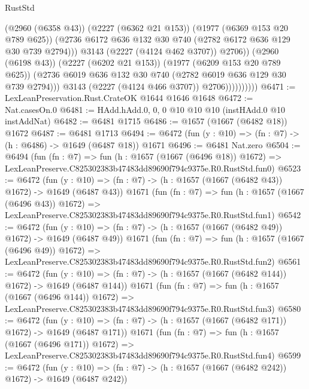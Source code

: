 \begin{lexlean}{RustStd}
\begin{coremodule}
                                (@2960 (@6358 @43))
                                (@2227 (@6362 @21 @153))
                                (@1977 (@6369 @153 @20 @789 @625))
                                (@2736
                                  @6172
                                  @636
                                  @132
                                  @30
                                  @740
                                  (@2782 @6172 @636 @129 @30 @739 @2794)))
                              @3143
                              (@2227 (@4124 @462 @3707))
                              @2706))
                          (@2960 (@6198 @43))
                          (@2227 (@6202 @21 @153))
                          (@1977 (@6209 @153 @20 @789 @625))
                          (@2736 @6019 @636 @132 @30 @740 (@2782 @6019 @636 @129 @30 @739 @2794)))
                        @3143
                        (@2227 (@4124 @466 @3707))
                        @2706))))))))))
@6471 := LexLeanPreservation.Rust.CrateOK @1644 @1646 @1648
@6472 := Nat.casesOn.{0}
@6481 := HAdd.hAdd.{0, 0, 0} @10 @10 @10 (instHAdd.{0} @10 instAddNat)
@6482 := @6481 @1715
@6486 := @1657 (@1667 (@6482 @18)) @1672
@6487 := @6481 @1713
@6494 := @6472 (fun (y : @10) => (fn : @7) -> (h : @6486) -> @1649 (@6487 @18)) @1671
@6496 := @6481 Nat.zero
@6504 := @6494
    (fun (fn : @7) =>
    fun (h : @1657 (@1667 (@6496 @18)) @1672) =>
    LexLeanPreserve.C825302383b47483dd89690f794c9375e.R0.RustStd.fun0)
@6523 := @6472
    (fun (y : @10) => (fn : @7) -> (h : @1657 (@1667 (@6482 @43)) @1672) -> @1649 (@6487 @43))
    @1671
    (fun (fn : @7) =>
    fun (h : @1657 (@1667 (@6496 @43)) @1672) =>
    LexLeanPreserve.C825302383b47483dd89690f794c9375e.R0.RustStd.fun1)
@6542 := @6472
    (fun (y : @10) => (fn : @7) -> (h : @1657 (@1667 (@6482 @49)) @1672) -> @1649 (@6487 @49))
    @1671
    (fun (fn : @7) =>
    fun (h : @1657 (@1667 (@6496 @49)) @1672) =>
    LexLeanPreserve.C825302383b47483dd89690f794c9375e.R0.RustStd.fun2)
@6561 := @6472
    (fun (y : @10) => (fn : @7) -> (h : @1657 (@1667 (@6482 @144)) @1672) -> @1649 (@6487 @144))
    @1671
    (fun (fn : @7) =>
    fun (h : @1657 (@1667 (@6496 @144)) @1672) =>
    LexLeanPreserve.C825302383b47483dd89690f794c9375e.R0.RustStd.fun3)
@6580 := @6472
    (fun (y : @10) => (fn : @7) -> (h : @1657 (@1667 (@6482 @171)) @1672) -> @1649 (@6487 @171))
    @1671
    (fun (fn : @7) =>
    fun (h : @1657 (@1667 (@6496 @171)) @1672) =>
    LexLeanPreserve.C825302383b47483dd89690f794c9375e.R0.RustStd.fun4)
@6599 := @6472
    (fun (y : @10) => (fn : @7) -> (h : @1657 (@1667 (@6482 @242)) @1672) -> @1649 (@6487 @242))

\end{coremodule}
\end{lexlean}
